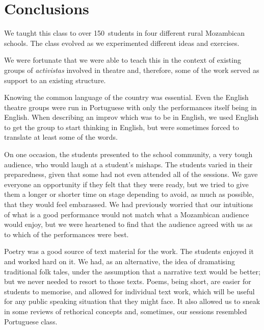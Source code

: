 \documentclass[article,twocolumn,twoside]{memoir}
\begin{document}
\chapter{Conclusions}

We taught this class to over 150~students in four different rural Mozambican
schools. The class evolved as we experimented different ideas and exercises.

We were fortunate that we were able to teach this in the context of existing
groups of \textit{activistas} involved in theatre and, therefore, some of the
work served as support to an existing structure.

Knowing the common language of the country was essential. Even the English
theatre groups were run in Portuguese with only the performances itself being
in English. When describing an improv which was to be in English, we used
English to get the group to start thinking in English, but were sometimes
forced to translate at least some of the words.

On one occasion, the students presented to the school community, a very tough
audience, who would laugh at a student's mishaps. The students varied in their
preparedness, given that some had not even attended all of the sessions. We
gave everyone an opportunity if they felt that they were ready, but we tried to
give them a longer or shorter time on stage depending to avoid, as much as
possible, that they would feel embarassed. We had previously worried that our
intuitions of what is a good performance would not match what a Mozambican
audience would enjoy, but we were heartened to find that the audience agreed
with us as to which of the performances were best.

Poetry was a good source of text material for the work. The students enjoyed it
and worked hard on it. We had, as an alternative, the idea of dramatising
traditional folk tales, under the assumption that a narrative text would be
better; but we never needed to resort to those texts. Poems, being short, are
easier for students to memorise, and allowed for individual text work, which
will be useful for any public speaking situation that they might face. It also
allowed us to sneak in some reviews of rethorical concepts and, sometimes, our
sessions resembled Portuguese class.
\end{document}
